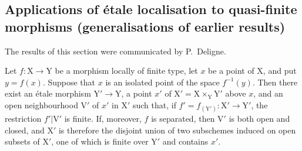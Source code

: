 \subsection{Applications of \'etale localisation to quasi-finite morphisms (generalisations of earlier results)}
\label{subsection:IV.18.12}

The results of this section were communicated by P.~Deligne.

\begin{theorem}[18.12.1]
\label{IV.18.12.1}
Let $f:\mathrm{X}\to\mathrm{Y}$ be a morphism locally of finite type, let $x$ be a point of $\mathrm{X}$, and put $y=f(x)$.
Suppose that $x$ is an isolated point of the space $f^{-1}(y)$.
Then there exist an \'etale morphism $\mathrm{Y}'\to\mathrm{Y}$, a point $x'$ of $\mathrm{X}'=\mathrm{X}\times_{\mathrm{Y}}\mathrm{Y}'$ above $x$, and an open neighbourhood $\mathrm{V}'$ of $x'$ in $\mathrm{X}'$ such that, if $f'=f_{(\mathrm{Y}')}:\mathrm{X}'\to\mathrm{Y}'$, the restriction $f'|\mathrm{V}'$ is finite.
If, moreover, $f$ is separated, then $\mathrm{V}'$ is both open and closed, and $\mathrm{X}'$ is therefore the disjoint union of two subschemes induced on open subsets of $\mathrm{X}'$, one of which is finite over $\mathrm{Y}'$ and contains $x'$.
\end{theorem}

